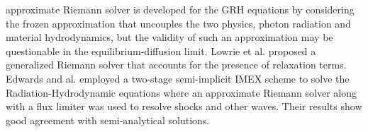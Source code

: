 \documentclass[times,doublespace]{fldauth}%
\begin{document}
approximate Riemann solver is developed for the GRH equations by considering the frozen approximation that 
uncouples the two physics, photon radiation and material hydrodynamics, but the validity of such an 
approximation may be questionable in the equilibrium-diffusion limit. Lowrie et al. \cite{LowrieMorelHittinger} 
proposed a generalized Riemann solver that accounts for the presence of relaxation terms. Edwards and al. 
\cite{EdwardsMorelLowrie} employed a two-stage semi-implicit IMEX scheme to solve the Radiation-Hydrodynamic 
equations where an approximate Riemann solver along with a flux limiter was used to resolve shocks and other waves. 
Their results show good agreement with semi-analytical solutions. 
\end{document}
